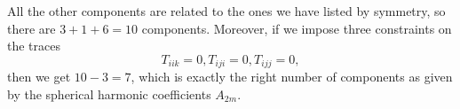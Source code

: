 All the other components are related to the ones we have listed by symmetry, so there are $3+1+6=10$ components. Moreover, if we impose three constraints on the traces
\begin{equation}
    T_{iik}=0, T_{iji}=0, T_{ijj}=0,
\end{equation}
then we get $10-3=7$, which is exactly the right number of components as given by the spherical harmonic coefficients $A_{2m}$.
